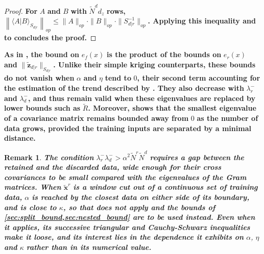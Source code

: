\documentclass[preprint]{elsarticle}
\newtheorem{remark}{Remark}
\begin{document}
\begin{proof}
    \textbf{For} $A$ \textbf{and} $B$ \textbf{with} $\tilde{N}^dd_z$ \textbf{rows,} $\left\|\langle A|B\rangle_{S_{d|r}}\right\|_{op}\leq\|A\|_{op}\cdot\|B\|_{op}\cdot\|S_{d|r}^{-1}\|_{op}$\textbf{. Applying this inequality and  to  concludes the proof.}
\end{proof}

\textbf{As in , the bound on} $e_f(x)$ \textbf{is the product of the bounds on} $e_r(x)$ \textbf{and} $\|\tilde{\mathbf{z}}_{d|r}\|_{S_{d|r}}$\textbf{. Unlike their simple kriging counterparts, these bounds do not vanish when} $\alpha$ \textbf{and} $\eta$ \textbf{tend to} $0$\textbf{, their second term accounting for the estimation of the trend described by . They also decrease with} $\lambda_r^-$ \textbf{and} $\lambda_d^-$\textbf{, and thus remain valid when these eigenvalues are replaced by lower bounds such as} $\tilde{R}$\textbf{. Moreover, \cite{bib:smallest-eigenvalues} shows that the smallest eigenvalue of a covariance matrix remains bounded away from} $0$ \textbf{as the number of data grows, provided the training inputs are separated by a minimal distance.}

\begin{remark}
    \textbf{The condition} $\lambda_r^-\lambda_d^->\alpha^2\tilde{N}^r\tilde{N}^d$ \textbf{requires a gap between the retained and the discarded data, wide enough for their cross covariances to be small compared with the eigenvalues of the Gram matrices. When} $\tilde{\mathbf{x}}^r$ \textbf{is a window cut out of a continuous set of training data,} $\alpha$ \textbf{is reached by the closest data on either side of its boundary, and is close to} $\kappa$\textbf{, so that  does not apply and the bounds of \cref{sec:split_bound,sec:nested_bound} are to be used instead. Even when it applies, its successive triangular and Cauchy-Schwarz inequalities make it loose, and its interest lies in the dependence it exhibits on} $\alpha$, $\eta$ \textbf{and} $\kappa$ \textbf{rather than in its numerical value.}\label{rem:entrywise_scope}
\end{remark}
\end{document}
